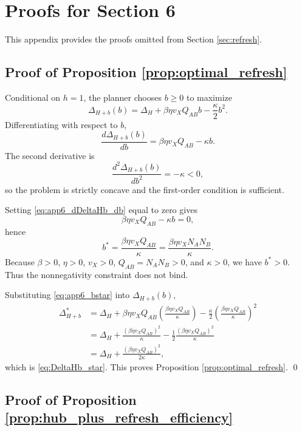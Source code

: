 \section{Proofs for Section 6}

This appendix provides the proofs omitted from Section \ref{sec:refresh}.

\subsection{Proof of Proposition \ref{prop:optimal_refresh}}

Conditional on $h=1$, the planner chooses $b\ge 0$ to maximize
\[
\Delta_{H+b}(b)
=
\Delta_H+\beta\eta v_XQ_{AB}b-\frac{\kappa}{2}b^2.
\]
Differentiating with respect to $b$,
\begin{equation}
\frac{d\Delta_{H+b}(b)}{db}
=
\beta\eta v_XQ_{AB}-\kappa b.
\label{eq:app6_dDeltaHb_db}
\end{equation}
The second derivative is
\begin{equation}
\frac{d^2\Delta_{H+b}(b)}{db^2}
=
-\kappa<0,
\label{eq:app6_d2DeltaHb_db2}
\end{equation}
so the problem is strictly concave and the first-order condition is sufficient.

Setting \eqref{eq:app6_dDeltaHb_db} equal to zero gives
\[
\beta\eta v_XQ_{AB}-\kappa b=0,
\]
hence
\begin{equation}
b^*=
\frac{\beta\eta v_XQ_{AB}}{\kappa}
=
\frac{\beta\eta v_XN_AN_B}{\kappa}.
\label{eq:app6_bstar}
\end{equation}
Because $\beta>0$, $\eta>0$, $v_X>0$, $Q_{AB}=N_AN_B>0$, and $\kappa>0$, we have $b^*>0$. Thus the nonnegativity constraint does not bind.

Substituting \eqref{eq:app6_bstar} into $\Delta_{H+b}(b)$,
\begin{align}
\Delta_{H+b}^*
&=
\Delta_H
+
\beta\eta v_XQ_{AB}
\left(
\frac{\beta\eta v_XQ_{AB}}{\kappa}
\right)
-
\frac{\kappa}{2}
\left(
\frac{\beta\eta v_XQ_{AB}}{\kappa}
\right)^2
\nonumber\\
&=
\Delta_H
+
\frac{(\beta\eta v_XQ_{AB})^2}{\kappa}
-
\frac{1}{2}\frac{(\beta\eta v_XQ_{AB})^2}{\kappa}
\nonumber\\
&=
\Delta_H+\frac{(\beta\eta v_XQ_{AB})^2}{2\kappa},
\label{eq:app6_DeltaHb_star}
\end{align}
which is \eqref{eq:DeltaHb_star}. This proves Proposition \ref{prop:optimal_refresh}.
\qed

\subsection{Proof of Proposition \ref{prop:hub_plus_refresh_efficiency}}

